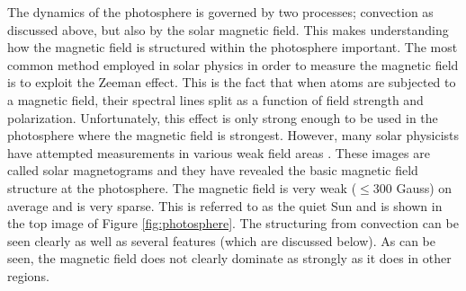     The dynamics of the photosphere is governed by two processes; convection as discussed above, but also by the solar magnetic field.
    This makes understanding how the magnetic field is structured within the photosphere important. 
    The most common method employed in solar physics in order to measure the magnetic field is to exploit the Zeeman effect.
    This is the fact that when atoms are subjected to a magnetic field, their spectral lines split as a function of field strength and polarization.
    Unfortunately, this effect is only strong enough to be used in the photosphere where the magnetic field is strongest.
    However, many solar physicists have attempted measurements in various weak field areas \citep{1995ApJ...439..474M,1538-4357-613-2-L177,2008A&A...489L..57K}.
    These images are called solar magnetograms and they have revealed the basic magnetic field structure at the photosphere.
    The magnetic field is very weak ($\le 300$ Gauss) on average and is very sparse.
    This is referred to as the quiet Sun and is shown in the top image of Figure \ref{fig:photosphere}. 
    The structuring from convection can be seen clearly as well as several features (which are discussed below).
    As can be seen, the magnetic field does not clearly dominate as strongly as it does in other regions.

